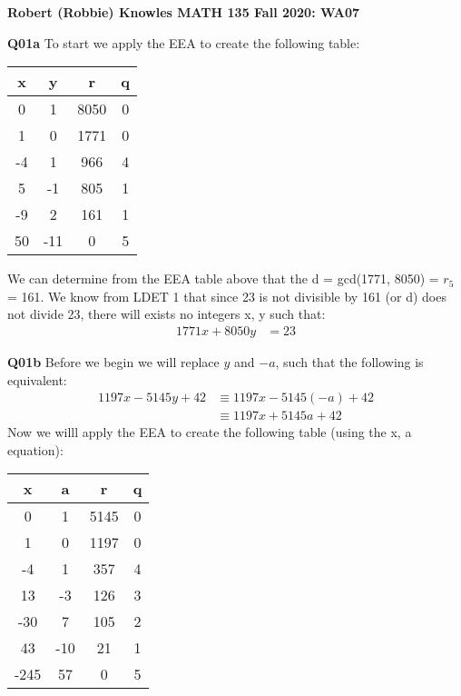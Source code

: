 \documentclass[11pt]{article}
\begin{document}
\parindent=0pt

\textbf{Robert (Robbie) Knowles MATH 135 Fall 2020: WA07}

\textbf{Q01a} To start we apply the EEA to create the following table:

\begin{center}
 \begin{tabular}{||c c c c||} 
 \hline
 x & y & r & q \\ [0.5ex] 
 \hline\hline
 0 & 1 & 8050 & 0 \\ 
 \hline
 1 & 0 & 1771 & 0 \\
 \hline
 -4 & 1 & 966 & 4 \\
 \hline
 5 & -1 & 805 & 1 \\
 \hline
 -9 &  2 & 161 & 1 \\ 
 \hline
 50 & -11  & 0 & 5 \\
 \hline

\end{tabular}
\end{center}

We can determine from the EEA table above that the d = gcd(1771, 8050) = $ r_5$ = 161. We know from LDET 1 that since 23 is not divisible by 161 (or d) does not divide 23, there will exists no integers x, y such that:
\begin{align*}
1771x + 8050y &= 23
\end{align*}

\textbf{Q01b} Before we begin we will replace $y$ and $-a$, such that the following is equivalent: 
\begin{align*}
1197x - 5145y + 42 & \equiv 1197x - 5145(-a) + 42\\
& \equiv 1197x + 5145a + 42
\end{align*}
Now we willl apply the EEA to create the following table (using the x, a equation):

\begin{center}
 \begin{tabular}{||c c c c||} 
 \hline
 x & a & r & q \\ [0.5ex] 
 \hline\hline
 0 & 1 & 5145 & 0 \\ 
 \hline
 1 & 0 & 1197 & 0 \\
 \hline
 -4 & 1 & 357 & 4 \\
 \hline
 13 & -3 & 126 & 3 \\
 \hline
 -30 &  7 & 105 & 2 \\ 
 \hline
 43 & -10  & 21 & 1 \\
 \hline
 -245 & 57  & 0 & 5 \\
 \hline
\end{tabular}
\end{center}
\end{document}
